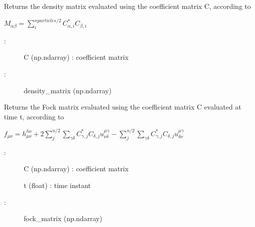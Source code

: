 \documentclass[letterpaper,10pt,english]{sphinxmanual}
\begin{document}
\begin{fulllineitems}
\begin{fulllineitems}
\begin{description}
\end{description}

\end{fulllineitems}


\begin{fulllineitems}
\label{\detokenize{index:do.RHF.fill_density_matrix}}
Returns the density matrix evaluated using the coefficient matrix C, according to

\(M_{\alpha\beta} = \sum_i^{nparticles/2} C_{\alpha,i}^* C_{\beta,i}\)
\begin{description}
\item[{:}] \leavevmode
C (np.ndarray) : coefficient matrix

\item[{:}] \leavevmode
density\_matrix (np.ndarray)

\end{description}

\end{fulllineitems}


\begin{fulllineitems}
\label{\detokenize{index:do.RHF.fill_fock_matrix}}
Returns the Fock matrix evaluated using the coefficient matrix C evaluated at time t, according to

\(f_{\mu\nu} =  h_{\mu\nu}^{ho} + 2\sum_{j}^{n/2} \sum_{\gamma\delta} C_{\gamma,j}^* C_{\delta,j} u^{\mu\gamma}_{\nu\delta} - \sum_{j}^{n/2} \sum_{\gamma\delta} C_{\gamma,j}^* C_{\delta,j} u^{\mu\gamma}_{\delta\nu}\)
\begin{description}
\item[{:}] \leavevmode
C (np.ndarray) : coefficient matrix

t (float) : time instant

\item[{:}] \leavevmode
fock\_matrix (np.ndarray)

\end{description}

\end{fulllineitems}


\end{fulllineitems}
\end{document}

